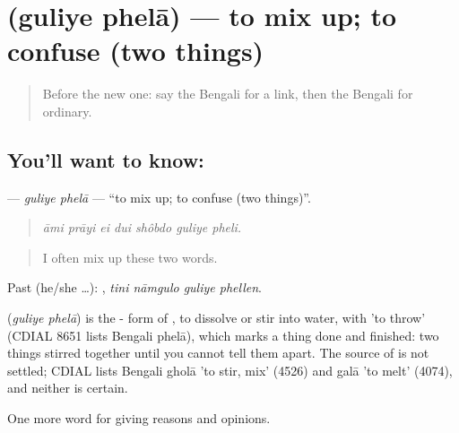 \section[\texorpdfstring{\bn{গুলিয়ে} \bn{ফেলা} (guliye phelā)}{গুলিয়ে ফেলা (guliye phelā)}]{  (guliye phelā) — to mix up; to confuse (two things)}

\label{lesson:BN-C358-guliye-phela}



\begin{quote}
Before the new one: say the Bengali for a link, then the Bengali for ordinary.
\end{quote}

\subsection*{You'll want to know:  }
\textbf{ } — \emph{guliye phelā} — \textquotedblleft{}to mix up; to confuse (two things)\textquotedblright{}.

\begin{quote}
      
\end{quote}

\begin{quote}
\emph{āmi prāyi ei dui shôbdo guliye pheli.}
\end{quote}

\begin{quote}
I often mix up these two words.
\end{quote}

Past (he/she …):    , \emph{tini nāmgulo guliye phellen}.

\begin{cousinweb}
\textbf{ } (\emph{guliye phelā}) is the - form of , to dissolve or stir into water, with  'to throw' (CDIAL 8651 lists Bengali phelā), which marks a thing done and finished: two things stirred together until you cannot tell them apart. The source of  is not settled; CDIAL lists Bengali gholā 'to stir, mix' (4526) and galā 'to melt' (4074), and neither is certain.
\end{cousinweb}

\begin{grammarlens}[title={What you've built}]
One more word for giving reasons and opinions.
\end{grammarlens}

